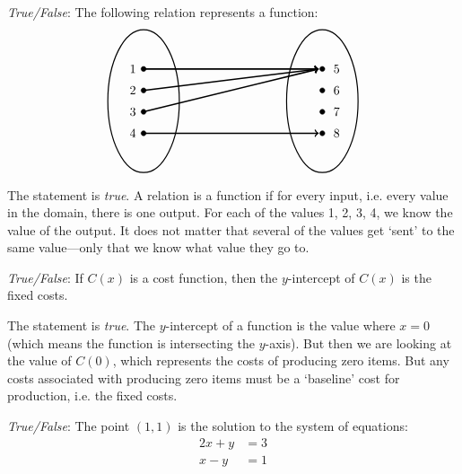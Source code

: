 \documentclass[11pt,letterpaper]{article}
\begin{document}
\thispagestyle{title}


\quizsol \textit{True/False}: The following relation represents a function:
	\[
	\begin{tikzpicture}
	\draw[line width=0.03cm] (0,0) circle (1 and 2);
	\draw[line width=0.03cm] (5,0) circle (1 and 2);
	
	\draw[fill=black] (0,0.9) circle (0.07);
	\draw[fill=black] (0,0.3) circle (0.07);
	\draw[fill=black] (0,-0.3) circle (0.07);
	\draw[fill=black] (0,-0.9) circle (0.07);
	
	\draw[fill=black] (5,0.9) circle (0.07);
	\draw[fill=black] (5,0.3) circle (0.07);
	\draw[fill=black] (5,-0.3) circle (0.07);
	\draw[fill=black] (5,-0.9) circle (0.07);
	
	\draw[line width=0.04cm,->] (0,0.9) -- (4.9,0.9);
	\draw[line width=0.04cm,->] (0,0.3) -- (4.9,0.9);
	\draw[line width=0.04cm,->] (0,-0.3) -- (4.9,0.9);
	\draw[line width=0.04cm,->] (0,-0.9) -- (4.9,-0.9);
	
	\node at (-0.3,0.9) {$1$};
	\node at (-0.3,0.3) {$2$};
	\node at (-0.3,-0.3) {$3$};
	\node at (-0.3,-0.9) {$4$};
	
	\node at (5.4,0.9) {$5$};
	\node at (5.4,0.3) {$6$};
	\node at (5.4,-0.3) {$7$};
	\node at (5.4,-0.9) {$8$};
	\end{tikzpicture}
	\]

\sol The statement is \textit{true}. A relation is a function if for every input, i.e. every value in the domain, there is one output. For each of the values 1, 2, 3, 4, we know the value of the output. It does not matter that several of the values get `sent' to the same value---only that we know what value they go to. \pvspace{1.5cm}



\quizsol \textit{True/False}: If $C(x)$ is a cost function, then the $y$-intercept of $C(x)$ is the fixed costs. \pspace

\sol The statement is \textit{true}. The $y$-intercept of a function is the value where $x= 0$ (which means the function is intersecting the $y$-axis). But then we are looking at the value of $C(0)$, which represents the costs of producing zero items. But any costs associated with producing zero items must be a `baseline' cost for production, i.e. the fixed costs. \pvspace{1.5cm}



\quizsol \textit{True/False}: The point $(1, 1)$ is the solution to the system of equations:
	\[
	\begin{aligned}
	2x + y&= 3 \\
	x - y&= 1
	\end{aligned}
	\]
\end{document}
